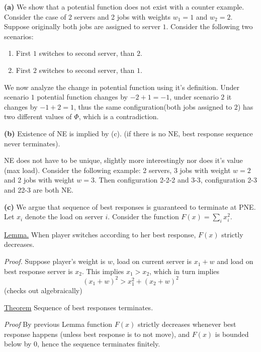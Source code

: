 \textbf{(a)} We show that a potential function does not exist with a counter example. Consider the case of 2 servers and 2 jobs with weights $w_1 = 1$ and $w_2 = 2$. Suppose originally both jobs are assigned to server $1$. Consider the following two scenarios:
\begin{enumerate}
\item First $1$ switches to second server, than $2$.
\item First $2$ switches to second server, than $1$.
\end{enumerate}
We now analyze the change in potential function using it's definition. Under scenario $1$ potential function changes by $-2+1=-1$, under scenario $2$ it changes by $-1+2=1$, thus the same configuration(both jobs assigned to $2$) has two different values of $\Phi$, which is a contradiction.

\textbf{(b)} Existence of NE is implied by (c). (if there is no NE, best response sequence never terminates).

NE does not have to be unique, slightly more interestingly nor does it's value (max load). Consider the following example: 2 servers, 3 jobs with weight $w=2$ and 2 jobs with weight $w=3$. Then configuration 2-2-2 and 3-3, configuration 2-3 and 22-3 are both NE.

\textbf{(c)} We argue that sequence of best responses is guaranteed to terminate at PNE. Let $x_i$ denote the load on server $i$. Consider the function $F(x) = \sum_i x_i^2$. 

\uline{Lemma.} When player switches according to her best response, $F(x)$ strictly decreases.

\textit{Proof.} Suppose player's weight is $w$, load on current server is $x_1+w$ and load on best response server is $x_2$. This implies $x_1>x_2$, which in turn implies 
$$(x_1+w)^2>x_1^2+(x_2+w)^2$$
(checks out algebraically)

\uline{Theorem} Sequence of best responses terminates.

\textit{Proof} By previous Lemma function $F(x)$ strictly decreases whenever best response happens (unless best response is to not move), and $F(x)$ is bounded below by $0$, hence the sequence terminates finitely.
